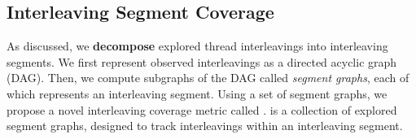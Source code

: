 % 



\subsection{Interleaving Segment Coverage}
\label{ss:coverage}

As discussed, we \textbf{decompose} explored thread interleavings into
interleaving segments.
%
We first represent observed interleavings as a directed acyclic graph
(DAG). Then, we compute subgraphs of the DAG called \textit{segment
  graphs}, each of which represents an interleaving segment.
%
Using a set of segment graphs, we propose a novel interleaving
coverage metric called \textit{\intcov}.
%
\Intcov is a collection of explored segment graphs, designed to track
interleavings within an interleaving segment.




